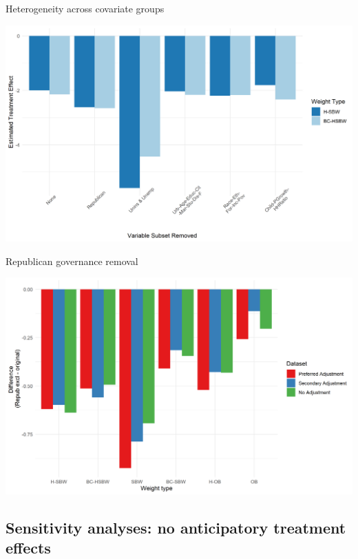 \documentclass[hyperref={pdfpagelabels=false}]{beamer}
\begin{document}
\begin{frame}{Heterogeneity across covariate groups}
\begin{center}
	\includegraphics[scale=0.5]{01_Plots/loo-covariates-main-c1.png}
\end{center}
\end{frame}

\begin{frame}{Republican governance removal}
\begin{center}
	\includegraphics[scale=0.5]{01_Plots/repub-diff-c1-robustness.png}
\end{center}
\end{frame}

\subsection{Sensitivity analyses: no anticipatory treatment effects}
\end{document}
